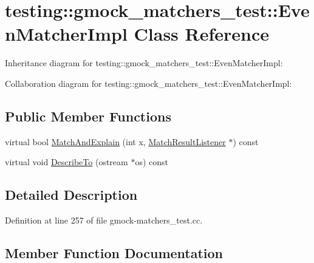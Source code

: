 \hypertarget{classtesting_1_1gmock__matchers__test_1_1_even_matcher_impl}{}\section{testing\+:\+:gmock\+\_\+matchers\+\_\+test\+:\+:Even\+Matcher\+Impl Class Reference}
\label{classtesting_1_1gmock__matchers__test_1_1_even_matcher_impl}


Inheritance diagram for testing\+:\+:gmock\+\_\+matchers\+\_\+test\+:\+:Even\+Matcher\+Impl\+:


Collaboration diagram for testing\+:\+:gmock\+\_\+matchers\+\_\+test\+:\+:Even\+Matcher\+Impl\+:
\subsection*{Public Member Functions}
\begin{DoxyCompactItemize}
\item 
virtual bool \hyperlink{classtesting_1_1gmock__matchers__test_1_1_even_matcher_impl_a91bd69693562946f5a11157ae1cc0e5c}{Match\+And\+Explain} (int x, \hyperlink{classtesting_1_1_match_result_listener}{Match\+Result\+Listener} $\ast$) const 
\item 
virtual void \hyperlink{classtesting_1_1gmock__matchers__test_1_1_even_matcher_impl_aa29ca9bfd5c704cba3bde3a1997d74f8}{Describe\+To} (ostream $\ast$os) const 
\end{DoxyCompactItemize}


\subsection{Detailed Description}


Definition at line 257 of file gmock-\/matchers\+\_\+test.\+cc.



\subsection{Member Function Documentation}
